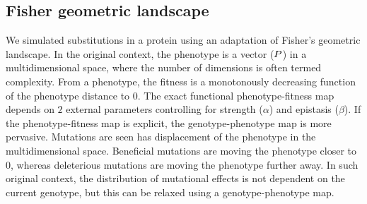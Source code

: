 \begin{table}[H]
    \centering
    \noindent{}
    \caption[Inferred amino-acid entropy for SimuPoly]{
    Estimated amino acids entropy under simulation accounting for finite population effects, site linkage and short term fluctuation of $\Ne$.
    Obtained with the inference model of site selection for amino-acid, and branch fluctuation of $\Ne$ (left column), or under the assumption of constant $\Ne$ (right column)}
\end{table}

\subsection{Fisher geometric landscape}
\label{subsec:fisher-geometric-landscape}

We simulated substitutions in a protein using an adaptation of Fisher's geometric landscape.
In the original context, the phenotype is a vector ($P$) in a multidimensional space, where the number of dimensions is often termed complexity.
From a phenotype, the fitness is a monotonously decreasing function of the phenotype distance to $0$.
The exact functional phenotype-fitness map depends on $2$ external parameters controlling for strength ($\alpha$) and epistasis ($\beta$).
If the phenotype-fitness map is explicit, the genotype-phenotype map is more pervasive.
Mutations are seen has displacement of the phenotype in the multidimensional space.
Beneficial mutations are moving the phenotype closer to $0$, whereas deleterious mutations are moving the phenotype further away.
In such original context, the distribution of mutational effects is not dependent on the current genotype, but this can be relaxed using a genotype-phenotype map.\\

